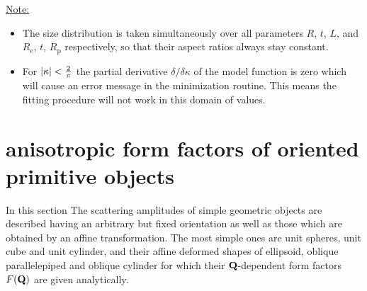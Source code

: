 \vspace{5mm}

\underline{Note:}
\begin{itemize}
\item The size distribution is taken simultaneously over all parameters $R$, $t$, $L$, and $R_\mathrm{e}$, $t$, $R_\mathrm{p}$ respectively, so that their aspect ratios always stay constant.
\item For $\abs{\kappa}<\frac{2}{\pi}$ the partial derivative $\delta /\delta\kappa$ of the model function is zero which will cause an error message in the minimization routine. This means the fitting procedure will not work in this domain of values.
\end{itemize}


\clearpage
\section{anisotropic form factors of oriented primitive objects}
\label{ch:OPO}

In this section The scattering amplitudes of simple geometric objects are described having an arbitrary but fixed orientation as well as those which are obtained by an affine transformation. The most simple ones are unit spheres, unit cube and unit cylinder, and their affine deformed shapes of ellipsoid,  oblique parallelepiped and  oblique cylinder for which their $\B{Q}$-dependent form factors $F(\B{Q})$ are given analytically.

